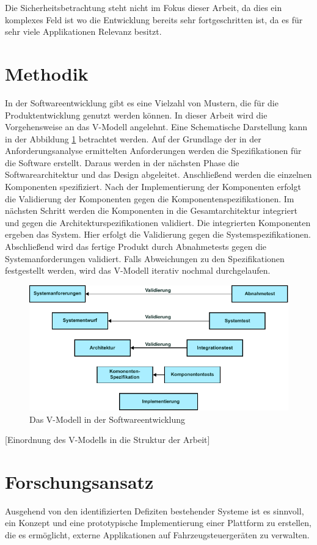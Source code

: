 Die Sicherheitsbetrachtung steht nicht im Fokus dieser Arbeit, da dies ein komplexes Feld ist wo die Entwicklung bereits sehr fortgeschritten ist, da es für sehr viele Applikationen Relevanz besitzt. 

\section{Methodik}

In der Softwareentwicklung gibt es eine Vielzahl von Mustern, die für die Produktentwicklung genutzt werden können. \cite{Bass2012} In dieser Arbeit wird die Vorgehensweise an das V-Modell angelehnt. Eine Schematische Darstellung kann in der Abbildung \ref{v-model} betrachtet werden. Auf der Grundlage der in der Anforderungsanalyse ermittelten Anforderungen werden die Spezifikationen für die Software erstellt. Daraus werden in der nächsten Phase die Softwarearchitektur und das Design abgeleitet. Anschließend werden die einzelnen Komponenten spezifiziert. Nach der Implementierung der Komponenten erfolgt die Validierung der Komponenten gegen die Komponentenspezifikationen. Im nächsten Schritt werden die Komponenten in die Gesamtarchitektur integriert und gegen die Architekturspezifikationen validiert. Die integrierten Komponenten ergeben das System. Hier erfolgt die Validierung gegen die Systemspezifikationen. Abschließend wird das fertige Produkt durch Abnahmetests gegen die Systemanforderungen validiert. Falls Abweichungen zu den Spezifikationen festgestellt werden, wird das V-Modell iterativ nochmal durchgelaufen. 

\begin{figure}[htbp]
	\centering
	\includegraphics[width=\textwidth]{./content/graphics/V-model.pdf}
	\caption{Das V-Modell in der Softwareentwicklung}
	\label{v-model}
\end{figure}

[Einordnung des V-Modells in die Struktur der Arbeit]

\section{Forschungsansatz}

Ausgehend von den identifizierten Defiziten bestehender Systeme ist es sinnvoll, ein Konzept und eine prototypische Implementierung einer Plattform zu erstellen, die es ermöglicht, externe Applikationen auf Fahrzeugsteuergeräten zu verwalten. 